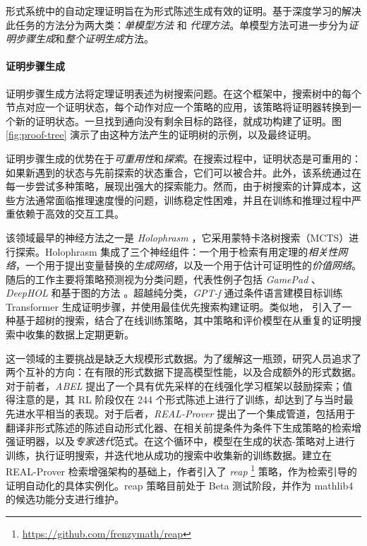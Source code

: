\documentclass[11pt]{article}
\numberwithin{equation}{section}
\begin{document}
形式系统中的自动定理证明旨在为形式陈述生成有效的证明。基于深度学习的解决此任务的方法分为两大类：\textit{单模型方法} 和 \textit{代理方法}。单模型方法可进一步分为\textit{证明步骤生成}和\textit{整个证明生成}方法。

\paragraph{证明步骤生成}
证明步骤生成方法将定理证明表述为树搜索问题。在这个框架中，搜索树中的每个节点对应一个证明状态，每个动作对应一个策略的应用，该策略将证明器转换到一个新的证明状态。一旦找到通向没有剩余目标的路径，就成功构建了证明。图 \ref{fig:proof-tree} 演示了由这种方法产生的证明树的示例，以及最终证明。

证明步骤生成的优势在于\textit{可重用性}和\textit{探索}。在搜索过程中，证明状态是可重用的：如果新遇到的状态与先前探索的状态重合，它们可以被合并。此外，该系统通过在每一步尝试多种策略，展现出强大的探索能力。然而，由于树搜索的计算成本，这些方法通常面临推理速度慢的问题，训练稳定性困难，并且在训练和推理过程中严重依赖于高效的交互工具。

该领域最早的神经方法之一是 \textit{Holophrasm} \cite{whalen2016holophrasm}，它采用蒙特卡洛树搜索（MCTS）进行探索。Holophrasm 集成了三个神经组件：一个用于检索有用定理的\textit{相关性网络}，一个用于提出变量替换的\textit{生成网络}，以及一个用于估计可证明性的\textit{价值网络}。随后的工作主要将策略预测视为分类问题，代表性例子包括 \textit{GamePad} \cite{huang2018gamepad}、\textit{DeepHOL} \cite{bansal2019holist} 和基于图的方法 \cite{paliwal2020graph}。超越纯分类，\textit{GPT-f} \cite{polu2020generative} 通过条件语言建模目标训练 Transformer 生成证明步骤，并使用最佳优先搜索构建证明。类似地，\cite{lample2022hypertree} 引入了一种基于超树的搜索，结合了在线训练策略，其中策略和评价模型在从重复的证明搜索中收集的数据上定期更新。

这一领域的主要挑战是缺乏大规模形式数据。为了缓解这一瓶颈，研究人员追求了两个互补的方向：在有限的形式数据下提高模型性能，以及合成额外的形式数据。对于前者，\textit{ABEL} \cite{gloeckle2024abel} 提出了一个具有优先采样的在线强化学习框架以鼓励探索；值得注意的是，其 RL 阶段仅在 244 个形式陈述上进行了训练，却达到了与当时最先进水平相当的表现。对于后者，\textit{REAL-Prover} \cite{shen2025real} 提出了一个集成管道，包括用于翻译非形式陈述的陈述自动形式化器、在相关前提条件为条件下生成策略的检索增强证明器，以及\textit{专家迭代}范式。在这个循环中，模型在生成的状态-策略对上进行训练，执行证明搜索，并迭代地从成功的搜索中收集新的训练数据。建立在 REAL-Prover 检索增强架构的基础上，作者引入了 \textit{reap} \footnote{\href{https://github.com/frenzymath/reap}{https://github.com/frenzymath/reap}} 策略，作为检索引导的证明自动化的具体实例化。reap 策略目前处于 Beta 测试阶段，并作为 mathlib4 的候选功能分支进行维护。
\end{document}
